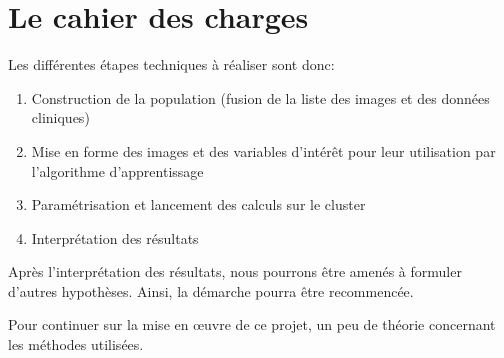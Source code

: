 \section{Le cahier des charges}

Les différentes étapes techniques à réaliser sont donc:
\begin{enumerate}
 \item Construction de la population (fusion de la liste des images et des données cliniques)
 \item Mise en forme des images et des variables d'intérêt pour leur utilisation par l'algorithme d'apprentissage
 \item Paramétrisation et lancement des calculs sur le cluster
 \item Interprétation des résultats
\end{enumerate}


Après l'interprétation des résultats, nous pourrons être amenés à formuler d'autres hypothèses.
Ainsi, la démarche pourra être recommencée.

Pour continuer sur la mise en œuvre de ce projet, un peu de théorie concernant les méthodes utilisées. 